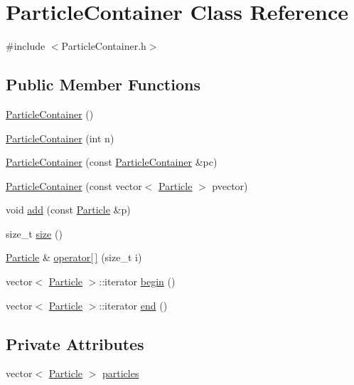 \hypertarget{classParticleContainer}{}\section{Particle\+Container Class Reference}
\label{classParticleContainer}


{\ttfamily \#include $<$Particle\+Container.\+h$>$}

\subsection*{Public Member Functions}
\begin{DoxyCompactItemize}
\item 
\hyperlink{classParticleContainer_a76d21bdb5141158cf664d65e2d8b1db7}{Particle\+Container} ()
\item 
\hyperlink{classParticleContainer_a3bd4be6aa403538ae5ad2486aa00573c}{Particle\+Container} (int n)
\item 
\hyperlink{classParticleContainer_a2141e6ca39db88b9571ea353226cf9be}{Particle\+Container} (const \hyperlink{classParticleContainer}{Particle\+Container} \&pc)
\item 
\hyperlink{classParticleContainer_af5a354c93415a3dad049cb3d1e36ea68}{Particle\+Container} (const vector$<$ \hyperlink{classParticle}{Particle} $>$ pvector)
\item 
void \hyperlink{classParticleContainer_a39d2ad5e9c6aff35fc5b41586e6b38b5}{add} (const \hyperlink{classParticle}{Particle} \&p)
\item 
size\+\_\+t \hyperlink{classParticleContainer_a1c9372075d296dc6409c21c4dcab6fb1}{size} ()
\item 
\hyperlink{classParticle}{Particle} \& \hyperlink{classParticleContainer_aeb7ed6e001bf1db025e688463e497fe7}{operator\mbox{[}$\,$\mbox{]}} (size\+\_\+t i)
\item 
vector$<$ \hyperlink{classParticle}{Particle} $>$\+::iterator \hyperlink{classParticleContainer_adb4830a518ab84b106e8b822f1daa884}{begin} ()
\item 
vector$<$ \hyperlink{classParticle}{Particle} $>$\+::iterator \hyperlink{classParticleContainer_ab2e17cea64b42fb049848fa6f7c56c81}{end} ()
\end{DoxyCompactItemize}
\subsection*{Private Attributes}
\begin{DoxyCompactItemize}
\item 
vector$<$ \hyperlink{classParticle}{Particle} $>$ \hyperlink{classParticleContainer_a7bc512a3ee04b6bae0d22f61097f4e8c}{particles}
\end{DoxyCompactItemize}


